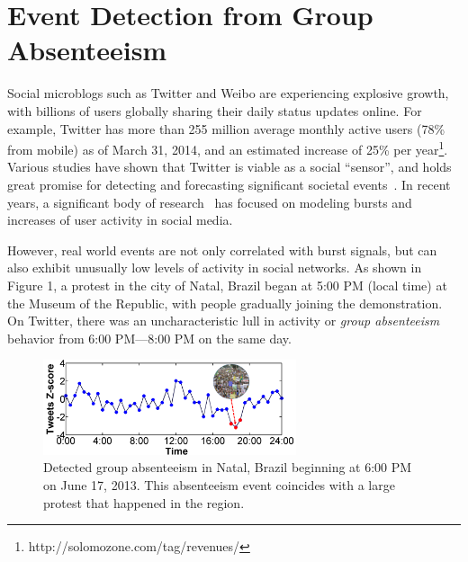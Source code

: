 \section{Event Detection from Group Absenteeism}


Social microblogs such as Twitter and Weibo are experiencing explosive growth, with billions of users globally sharing their daily status updates online.
For example, Twitter has more than 255 million average monthly active users (78\% from mobile) as of March 31, 2014, and an estimated increase of 25\% per year\footnote{http://solomozone.com/tag/revenues/}.
Various studies have shown that Twitter is viable as a social ``sensor'', and holds great promise for detecting and forecasting significant societal events~\cite{bugel2013multilingual,sakaki2010earthquake}.
In recent years, a significant body of research~\cite{aggarwal2012event,hong2012discovering,lappas2009burstiness,lappas2012spatiotemporal,sakaki2010earthquake,sayyadi2009event,watanabe2011jasmine,weng2011event,yin2011geographical} has focused on modeling bursts and increases of user activity in social media.

However, real world events are not only correlated with burst signals, but can also exhibit unusually low levels of activity in social networks.
As shown in Figure 1, a protest in the city of Natal, Brazil began at 5:00 PM (local time) at the Museum of the Republic, with people gradually joining the demonstration. %
On Twitter, there was an uncharacteristic lull in activity or {\it group absenteeism} behavior from 6:00 PM---8:00 PM on the same day.

\begin{figure}[t]
\centering
\includegraphics[height=1.1in]{figures/Natal_example1.png}
\caption{Detected group absenteeism in Natal, Brazil beginning at 6:00 PM on June 17, 2013. This absenteeism event coincides with a large protest that happened in the region.}
\vspace{-1em}
\label{fig:natal-protest}
\end{figure}

